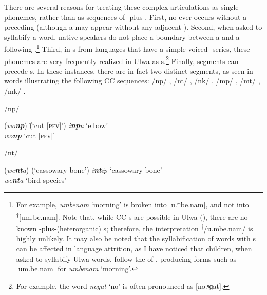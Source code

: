 There are several reasons for treating these complex articulations as single phonemes, rather than as sequences of -plus-. First, no   ever occurs without a preceding  (although a  may appear without any adjacent ). Second, when asked to syllabify a word, native speakers do not place a  boundary between a  and a following  .\footnote{For example, \textit{umbenam} ‘morning’ is broken into [u.ᵐbe.nam], and not into \textsuperscript{†}[um.be.nam]. Note that, while CC s are possible in Ulwa (), there are no known -plus-(heterorganic)  s; therefore, the interpretation \textsuperscript{†}/u.mbe.nam/ is highly unlikely. It may also be noted that the syllabification of words with  s can be affected in language attrition, as I have noticed that children, when asked to syllabify Ulwa words, follow the  of , producing forms such as [um.be.nam] for \textit{umbenam} ‘morning’.} Third, in s from languages that have a simple voiced- series, these phonemes are very frequently realized in Ulwa as   s.\footnote{For example, the  word \textit{nogat} ‘no’ is often pronounced as [no.ᵑɡat].} Finally,  segments can precede  s. In these instances, there are in fact two distinct segments, as seen in words illustrating the following CC sequences: /np/ , /nt/ , /nk/ , /mp/ , /mt/ , /mk/ .

\ea%
    \label{ex:phon:9}
            /np/\\
\begin{tabbing}
{(\textit{wo\textbf{np}})} \= {(‘cut [\textsc{pfv]}’)}\kill
{\textit{i\textbf{np}u}} \> {‘elbow’}\\
{\textit{wo\textbf{np}}} \> {‘cut [\textsc{pfv]}’}
\end{tabbing}
\z

\ea%
    \label{ex:phon:10}
          /nt/\\
\begin{tabbing}
{(\textit{we\textbf{nt}a})} \= {(‘cassowary bone’)}\kill
{\textit{i\textbf{nt}ïp}} \> {‘cassowary bone’}\\
{\textit{we\textbf{nt}a}} \> {‘bird species’}
\end{tabbing}
\z

